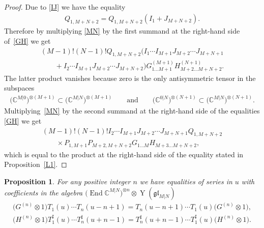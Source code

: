 \documentclass[10pt,a4paper]{amsart}
\numberwithin{equation}{section}
\newtheorem{Proposition}[Theorem]{Proposition}
\def\CC{{\mathbb{C}}}
\def\CMN{\CC^{M|N}}
\def\End{\operatorname{End}}
\def\glMN{\mathfrak{gl}_{M|N}}
\def\ot{\otimes}
\def\TS{T^{\sharp}}
\def\YMN{\operatorname{Y}(\glMN)}
\begin{document}
\begin{proof}
Due to \eqref{IJ} we have the equality
\begin{gather*}
Q_{1,M+N+2}=Q_{1,M+N+2} ( I_{1}+J_{M+N+2} ) .
\end{gather*}
Therefore by multiplying \eqref{MN} by the first summand at the
right-hand side of~\eqref{GH} we get
\begin{gather*}
(M-1) ! (N-1) ! Q_{1,M+N+2}
( I_{1} \cdots I_{M+1}
J_{M+2} \cdots J_{M+N+1}
\\
\qquad{} + I_{2} \cdots I_{M+1}
J_{M+2} \cdots J_{M+N+2} )
G^{(M+1)}_{1 \dots M+1} H^{(N+1)}_{M+2 \dots M+N+2} .
\end{gather*}
The latter product vanishes because zero is the only
antisymmetric tensor in the subspaces
\begin{gather*}
\big(\CC^{M| 0}\big)^{\ot (M+1)}\subset\big(\CMN\big)^{\ot (M+1)}
\qquad\text{and}\qquad
\big(\CC^{0 |N}\big)^{\ot (N+1)}\subset\big(\CMN\big)^{\ot (N+1)} .
\end{gather*}
Multiplying~\eqref{MN} by the second summand at the
right-hand side of the equalities \eqref{GH} we get
\begin{gather*}
(M-1) ! (N-1) ! I_{2} \cdots I_{M+1} J_{M+2} \cdots J_{M+N+1} Q_{1,M+N+2}\\
\qquad {} \times P_{1,M+1} P_{M+2,M+N+2}
G_{1 \dots M} H_{M+3 \dots M+N+2},
\end{gather*}
which is equal to the product at the right-hand side of the equality stated in Proposition~\ref{L1}.
\end{proof}

\begin{Proposition}\label{P}
For any positive integer $n$ we have equalities of series in $u$ with coefficients in the algebra
$\big(\End\CMN\big)^{\ot n}\ot\YMN$
\begin{gather*}
\big(G^{(n)}\ot1\big) T_1(u) \cdots T_n(u-n+1) =
T_n(u-n+1) \cdots T_1(u) \big(G^{(n)}\ot1\big) ,\\
\big(H^{(n)}\ot1\big) \TS_1(u) \cdots \TS_n(u+n-1) =
\TS_n(u+n-1) \cdots \TS_1(u) \big(H^{(n)}\ot1\big) .
\end{gather*}
\end{Proposition}
\end{document}
